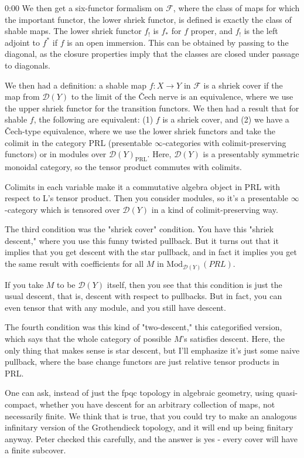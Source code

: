 \begin{unfinished}{0:00}
We then get a six-functor formalism on $\mathcal{F}$, where the class of maps for which the important functor, the lower shriek functor, is defined is exactly the class of shable maps. The lower shriek functor $f_!$ is $f_*$ for $f$ proper, and $f_!$ is the left adjoint to $f^*$ if $f$ is an open immersion. This can be obtained by passing to the diagonal, as the closure properties imply that the classes are closed under passage to diagonals.

We then had a definition: a shable map $f: X \to Y$ in $\mathcal{F}$ is a shriek cover if the map from $\mathcal{D}(Y)$ to the limit of the Čech nerve is an equivalence, where we use the upper shriek functor for the transition functors. We then had a result that for shable $f$, the following are equivalent: (1) $f$ is a shriek cover, and (2) we have a Čech-type equivalence, where we use the lower shriek functors and take the colimit in the category $\mathrm{PRL}$ (presentable $\infty$-categories with colimit-preserving functors) or in modules over $\mathcal{D}(Y)_\mathrm{PRL}$. Here, $\mathcal{D}(Y)$ is a presentably symmetric monoidal category, so the tensor product commutes with colimits.

Colimits in each variable make it a commutative algebra object in PRL with respect to L's tensor product. Then you consider modules, so it's a presentable $\infty$-category which is tensored over $\mathcal{D}(Y)$ in a kind of colimit-preserving way.

The third condition was the "shriek cover" condition. You have this "shriek descent," where you use this funny twisted pullback. But it turns out that it implies that you get descent with the star pullback, and in fact it implies you get the same result with coefficients for all $M$ in $\mathrm{Mod}_{\mathcal{D}(Y)}(PRL)$. 

If you take $M$ to be $\mathcal{D}(Y)$ itself, then you see that this condition is just the usual descent, that is, descent with respect to pullbacks. But in fact, you can even tensor that with any module, and you still have descent.

The fourth condition was this kind of "two-descent," this categorified version, which says that the whole category of possible $M$'s satisfies descent. Here, the only thing that makes sense is star descent, but I'll emphasize it's just some naive pullback, where the base change functors are just relative tensor products in PRL.

One can ask, instead of just the fpqc topology in algebraic geometry, using quasi-compact, whether you have descent for an arbitrary collection of maps, not necessarily finite. We think that is true, that you could try to make an analogous infinitary version of the Grothendieck topology, and it will end up being finitary anyway. Peter checked this carefully, and the answer is yes - every cover will have a finite subcover.


\end{unfinished}
